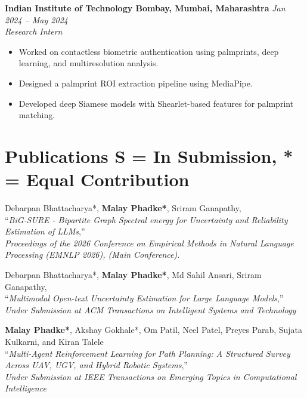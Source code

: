 \documentclass[a4paper,10pt]{article}
\begin{document}
\textbf{Indian Institute of Technology Bombay, Mumbai, Maharashtra} \hfill \textit{Jan 2024 -- May 2024}\\
\textit{Research Intern} \vspace{-0.4em}
\begin{itemize}
    \item Worked on contactless biometric authentication using palmprints, deep learning, and multiresolution analysis.
    \item Designed a palmprint ROI extraction pipeline using MediaPipe.
    \item Developed deep Siamese models with Shearlet-based features for palmprint matching.
\end{itemize}

\section*{Publications \hfill \normalfont\small S = In Submission,\; * = Equal Contribution}

\noindent
[\textbf{C.1}] Debarpan Bhattacharya*, \textbf{Malay Phadke*}, Sriram Ganapathy,\\ 
``\textit{BiG-SURE - Bipartite Graph Spectral energy for Uncertainty and Reliability Estimation of LLMs},''\\
\textit{Proceedings of the 2026 Conference on Empirical Methods in Natural Language Processing (EMNLP 2026), (Main Conference)}. \; 



\vspace{0.25em}
\noindent
[\textbf{S.1}] Debarpan Bhattacharya*, \textbf{Malay Phadke*}, Md Sahil Ansari, Sriram Ganapathy,\\
``\textit{Multimodal Open-text Uncertainty Estimation for Large Language Models},''\\
\textit{Under Submission at ACM Transactions on Intelligent Systems and Technology} \;



\vspace{0.25em}
\noindent
[\textbf{S.2}] \textbf{Malay Phadke*}, Akshay Gokhale*, Om Patil, Neel Patel, Preyes Parab, Sujata Kulkarni, and Kiran Talele\\
``\textit{Multi-Agent Reinforcement Learning for Path Planning: A Structured Survey Across UAV, UGV, and Hybrid Robotic Systems},''\\
\textit{Under Submission at IEEE Transactions on Emerging Topics in Computational Intelligence}
\end{document}
